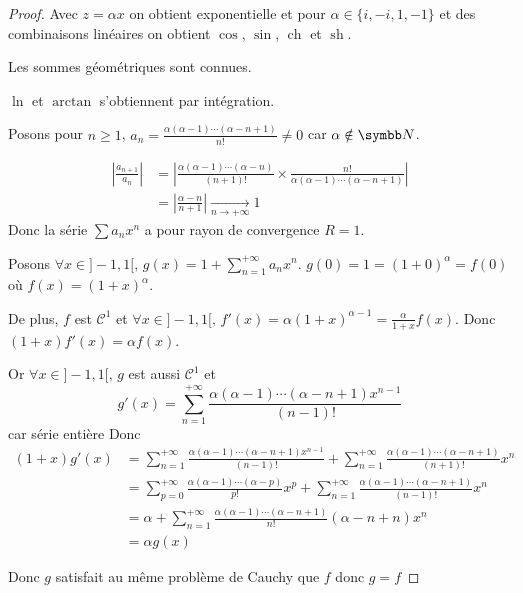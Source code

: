 \begin{proof}
    Avec $z = \alpha x$ on obtient exponentielle et pour $\alpha \in \{i, -i, 1, -1\}$ et des combinaisons linéaires on obtient 
    $\cos$, $\sin$, $\operatorname{ch}$ et $\operatorname{sh}$.

    Les sommes géométriques sont connues. 

    $\ln$ et $\arctan$ s'obtiennent par intégration. 

    Posons pour $n \geqslant 1$, $a_n = \frac{\alpha (\alpha - 1) \cdots (\alpha - n + 1)}{n!} \neq 0$ 
    car $\alpha \notin \N$.  

    \begin{align*}
        \left| \frac{a_{n + 1}}{a_n} \right| & = \left| \frac{\alpha (\alpha - 1) \cdots (\alpha - n)}{(n + 1)!} \times \frac{n!}{\alpha (\alpha - 1) \cdots (\alpha - n + 1)} \right| \\
        & = \left| \frac{\alpha - n }{n + 1} \right| \xrightarrow[n \to + \infty]{} 1
    \end{align*}
    Donc la série $\sum a_n x^n$ a pour rayon de convergence $R = 1$.

    Posons $\displaystyle \forall x \in ]-1, 1[, \, g(x) = 1 + \sum_{n = 1}^{+\infty} a_n x^n$. 
    $g(0) = 1 = (1 + 0)^\alpha = f(0)$ où $f(x) = (1 + x)^\alpha$. 

    De plus, $f$ est $\mathscr C^1$ et $\forall x \in ]-1, 1[, \, f'(x) = \alpha (1 + x)^{\alpha - 1} = \frac \alpha {1 + x} f(x)$.
    Donc $(1 + x) f'(x) = \alpha f(x)$. 

    Or $\forall x \in ]-1, 1[, \, g$ est aussi $\mathscr C^1$ et
    \[g'(x) = \sum_{n = 1 }^{+ \infty  } \frac{\alpha (\alpha - 1) \cdots (\alpha - n + 1) x^{n - 1}}{(n - 1 )! }\] car série entière 
    Donc 
    \begin{align*}
        (1 + x) g'(x) & = \displaystyle \sum_{n = 1 }^{+ \infty   } \frac{\alpha (\alpha - 1) \cdots (\alpha - n + 1) x^{n - 1}}{(n - 1)!} + \sum_{n = 1 }^{+ \infty   } \frac{\alpha (\alpha - 1) \cdots (\alpha - n + 1) }{(n + 1)!} x^n \\
        & = \sum_{p = 0 }^{+ \infty    } \frac{\alpha (\alpha - 1) \cdots (\alpha - p)}{p!} x^p + \sum_{n = 1 }^{+ \infty   } \frac{\alpha (\alpha - 1) \cdots (\alpha - n + 1)}{(n - 1)!} x^n \\
        & = \alpha + \sum_{n = 1 }^{+ \infty   } \frac{\alpha (\alpha - 1) \cdots (\alpha - n + 1)}{n! } (\alpha - n + n) x^n \\
        & = \alpha g(x)
    \end{align*}

    Donc $g$ satisfait au même problème de Cauchy que $f$ donc $g = f$ 
\end{proof}

